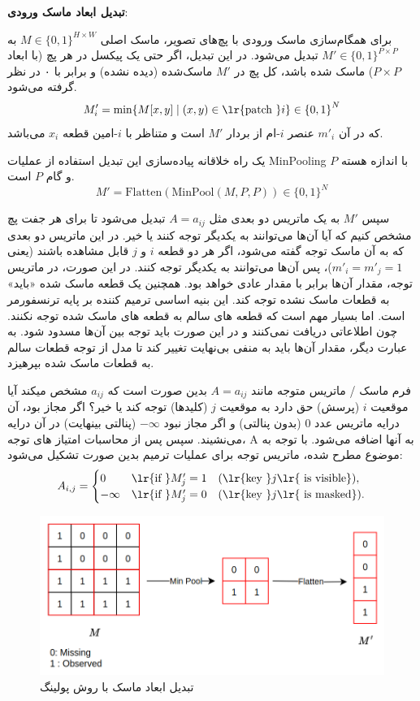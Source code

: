 \textbf{تبدیل ابعاد ماسک ورودی}: 


برای همگام‌سازی ماسک ورودی با پچ‌های تصویر، ماسک اصلی 
$ M \in \{0,1\}^{H \times W} $
به
$ M' \in \{0,1\}^{P \times P} $
 تبدیل می‌شود. در این تبدیل، اگر حتی یک پیکسل در هر پچ (با ابعاد \( P \times P \)) ماسک شده باشد، کل پچ در \( M' \) ماسک‌شده (دیده نشده) و برابر با ۰ در نظر گرفته می‌شود.
$$
M'_i = \min \{ M[x, y] \mid (x, y) \in \text{\lr{patch }} i \} \in {\{0,1\}}^{N}
$$
که در آن $ m'_i $ عنصر $i$-ام از بردار  $M'$ است و متناظر با $i$-امین قطعه $ x_i$  می‌باشد.

یک راه خلاقانه پیاده‌سازی این تبدیل استفاده از عملیات MinPooling با اندازه هسته $P$ و گام $P$ است.
$$
M' = \text{Flatten}(\text{MinPool}(M, P, P)) \in {\{0,1\}}^{N}
$$


سپس $M'$ به یک ماتریس دو بعدی مثل $ A = a_{ij} $ تبدیل می‌شود تا برای هر جفت پچ مشخص کنیم که آیا آن‌ها می‌توانند به یکدیگر توجه کنند یا خیر. در این ماتریس دو بعدی که به آن ماسک توجه
 گفته می‌شود، اگر هر دو قطعه \( i \) و \( j \) قابل مشاهده باشند (یعنی \( m'_i = m'_j = 1 \))، پس آن‌ها می‌توانند به یکدیگر توجه کنند. در این صورت، در ماتریس توجه، مقدار آن‌ها برابر با مقدار عادی خواهد بود. همچنین یک قطعه ماسک شده «باید» به قطعات ماسک نشده توجه کند. این بنیه اساسی ترمیم کننده بر پایه ترنسفورمر است. اما بسیار مهم است که قطعه های سالم به قطعه های ماسک شده توجه نکنند. چون اطلاعاتی دریافت نمی‌کنند و در این صورت باید توجه بین آن‌ها مسدود شود. به عبارت دیگر، مقدار آن‌ها باید به منفی بی‌نهایت تغییر کند تا مدل از توجه قطعات سالم به قطعات ماسک شده بپرهیزد.
 
 فرم ماسک / ماتریس متوجه مانند $ A = a_{ij} $ بدین صورت است که $a_{ij}$ مشخص میکند آیا موقعیت $i$ (پرسش) حق دارد به موقعیت $j$ (کلیدها) توجه کند یا خیر؟ اگر مجاز بود، آن درایه ماتریس عدد 0 (بدون پنالتی) و اگر مجاز نبود $- \infty$ (پنالتی بینهایت) در آن درایه می‌نشیند. سپس پس از محاسبات امتیاز های توجه،‌ A به آنها اضافه می‌شود.
 با توجه به موضوع مطرح شده، ماتریس توجه برای عملیات ترمیم بدین صورت تشکیل می‌شود:
$$
  A_{i,j} = \begin{cases} 
	0 & \text{\lr{if }} M'_j = 1 \quad (\text{\lr{key }} j \text{\lr{ is visible}}), \\
	-\infty & \text{\lr{if }} M'_j = 0 \quad (\text{\lr{key }} j \text{\lr{ is masked}}).
\end{cases}
$$


\begin{figure}
	\centering
	\includegraphics[width=1\linewidth]{maskConv1}
	\caption{تبدیل ابعاد ماسک با روش پولینگ}
	\label{fig:maskconv1}
\end{figure}

